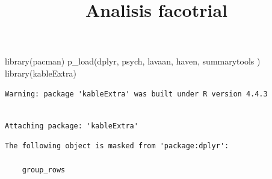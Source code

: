 \documentclass[
  letterpaper,
  DIV=11,
  numbers=noendperiod]{scrartcl}
\title{Analisis facotrial}
\author{}
\date{}
\newenvironment{Shaded}{\begin{snugshade}}{\end{snugshade}}
\newcommand{\FunctionTok}[1]{\textcolor[rgb]{0.28,0.35,0.67}{#1}}
\newcommand{\NormalTok}[1]{\textcolor[rgb]{0.00,0.23,0.31}{#1}}
\begin{document}
\maketitle


\begin{Shaded}
\begin{Highlighting}[]
\FunctionTok{library}\NormalTok{(pacman)}
\FunctionTok{p\_load}\NormalTok{(dplyr,}
\NormalTok{       psych,}
\NormalTok{       lavaan,}
\NormalTok{       haven,}
\NormalTok{       summarytools}
\NormalTok{       )}
\FunctionTok{library}\NormalTok{(kableExtra)}
\end{Highlighting}
\end{Shaded}

\begin{verbatim}
Warning: package 'kableExtra' was built under R version 4.4.3
\end{verbatim}

\begin{verbatim}

Attaching package: 'kableExtra'
\end{verbatim}

\begin{verbatim}
The following object is masked from 'package:dplyr':

    group_rows
\end{verbatim}
\end{document}
